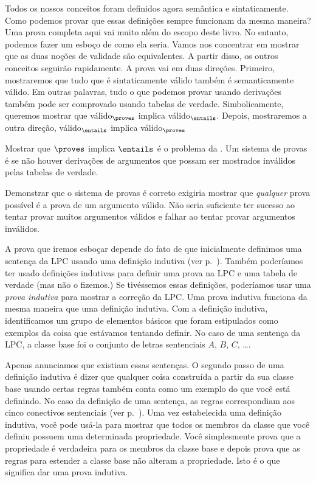 Todos os nossos conceitos foram definidos agora semântica e sintaticamente. Como podemos provar que essas definições sempre funcionam da mesma maneira? Uma prova completa aqui vai muito além do escopo deste livro. No entanto, podemos fazer um esboço de como ela seria. Vamos nos concentrar em mostrar que as duas noções de validade são equivalentes. A partir disso, os outros conceitos seguirão rapidamente. A prova vai em duas direções. Primeiro,  mostraremos que tudo que é sintaticamente válido também é semanticamente válido. Em outras palavras, tudo o que podemos provar usando derivações também pode ser comprovado usando tabelas de verdade. Simbolicamente,  queremos mostrar que  válido$_{\proves}$ implica válido$_{\entails}$. Depois, mostraremos a outra  direção, válido$_{\entails}$ implica válido$_{\proves}$

  

Mostrar que $\proves $ implica  $\entails $  é  o problema da . \label{def:soundness} Um sistema de provas é   se não houver derivações de argumentos que possam ser mostrados inválidos pelas tabelas de verdade. 
 \label{def_Soundness} 

Demonstrar que o sistema de provas é correto exigiria mostrar que  \emph{qualquer} prova possível é a prova de um argumento válido. Não seria suficiente ter sucesso ao tentar provar muitos argumentos válidos e falhar ao tentar provar argumentos inválidos.

A prova que iremos esboçar depende do fato de que inicialmente definimos uma sentença da LPC usando uma definição indutiva (ver p.~\pageref{TFLsentences}). Também poderíamos ter usado definições indutivas para definir uma prova na LPC e uma tabela de verdade (mas não o fizemos.)  Se tivéssemos essas definições, poderíamos usar uma \emph{prova indutiva} para mostrar a correção da LPC. Uma prova indutiva funciona da mesma maneira que uma definição indutiva. Com a definição indutiva, identificamos um grupo de elementos básicos que foram estipulados como exemplos da coisa que estávamos tentando definir. No caso de uma sentença da LPC, a classe base foi o conjunto de letras sentenciais $A$, $B$, $C$, \dots. 

Apenas anunciamos que existiam essas sentenças. O segundo passo de uma definição indutiva é dizer que qualquer coisa construída a partir da sua classe base usando certas regras também conta como um exemplo do que você está definindo. No caso da definição de uma sentença, as regras correspondiam aos cinco conectivos sentenciais (ver  p.~\pageref{TFLsentences}). Uma vez  estabelecida uma definição indutiva, você pode usá-la para mostrar que todos os membros da classe que você definiu possuem uma determinada propriedade. Você simplesmente prova que a propriedade é verdadeira para os membros da classe base e depois prova que as regras para estender a classe base não alteram a propriedade. Isto é o que significa dar uma prova indutiva.
 
